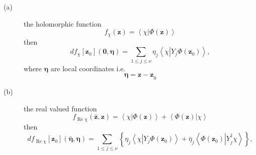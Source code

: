\documentclass[aps,preprint]{revtex4}%
\begin{document}
\begin{description}
\item[(a)] the holomorphic function
\begin{equation}
f_{\chi}\left(  \mathbf{z}\right)  =\left\langle \chi\left\vert \Phi\left(
\mathbf{z}\right)  \right.  \right\rangle
\end{equation}
then
\begin{equation}
df_{\chi}\left[  \mathbf{z}_{0}\right]  \left(  \mathbf{0,\eta}\right)
=\sum_{1\leq j\leq\nu}\eta_{j}\left\langle \chi\left\vert Y_{j}\Phi\left(
\mathbf{z}_{0}\right)  \right.  \right\rangle ,
\end{equation}
where $\mathbf{\eta}$ are local coordinates i.e.
\begin{equation}
\mathbf{\eta=z-z}_{0}%
\end{equation}


\item[(b)] the real valued function%
\begin{equation}
f_{\operatorname{Re}\chi}\left(  \mathbf{\bar{z},z}\right)  =\left\langle
\chi\left\vert \Phi\left(  \mathbf{z}\right)  \right.  \right\rangle
+\left\langle \Phi\left(  \mathbf{z}\right)  \left\vert \chi\right.
\right\rangle
\end{equation}
then
\begin{equation}
df_{\operatorname{Re}\chi}\left[  \mathbf{z}_{0}\right]  \left(
\mathbf{\bar{\eta},\eta}\right)  =\sum_{1\leq j\leq\nu}\left\{  \eta
_{j}\left\langle \chi\left\vert Y_{j}\Phi\left(  \mathbf{z}_{0}\right)
\right.  \right\rangle +\bar{\eta}_{j}\left\langle \Phi\left(  \mathbf{z}%
_{0}\right)  \left\vert Y_{j}^{\dagger}\right.  \chi\right\rangle \right\}  ,
\end{equation}



\end{description}
\end{document}
